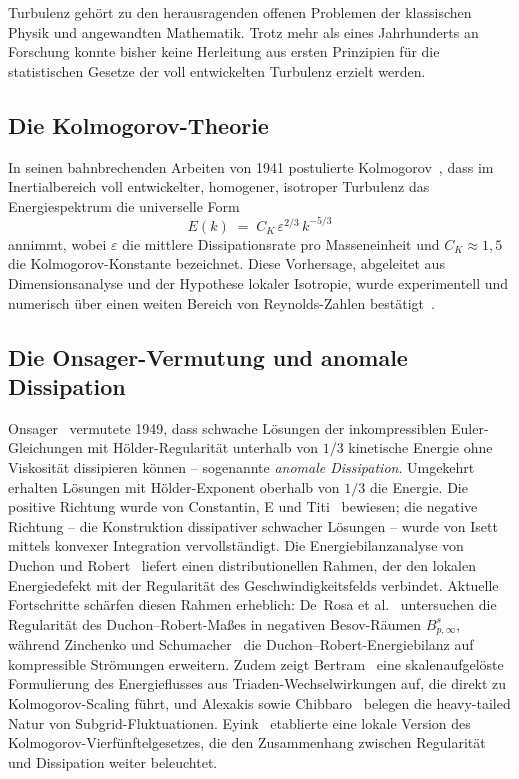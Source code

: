 \documentclass[12pt,a4paper]{article}
\theoremstyle{breakdef}
\theoremstyle{breakplain}
\theoremstyle{breakdef}
\begin{document}
Turbulenz gehört zu den herausragenden offenen Problemen der klassischen
Physik und angewandten Mathematik. Trotz mehr als eines Jahrhunderts an
Forschung konnte bisher keine Herleitung aus ersten Prinzipien für die
statistischen Gesetze der voll entwickelten Turbulenz erzielt werden.

\subsection{Die Kolmogorov-Theorie}

In seinen bahnbrechenden Arbeiten von 1941 postulierte
Kolmogorov~\cite{K41a,K41b}, dass im Inertialbereich voll entwickelter,
homogener, isotroper Turbulenz das Energiespektrum die universelle Form
\begin{equation}\label{eq:K41}
  E(k) \;=\; C_K \,\varepsilon^{2/3}\, k^{-5/3}
\end{equation}
annimmt, wobei $\varepsilon$ die mittlere Dissipationsrate pro
Masseneinheit und $C_K \approx 1{,}5$ die Kolmogorov-Konstante bezeichnet.
Diese Vorhersage, abgeleitet aus Dimensionsanalyse und der Hypothese
lokaler Isotropie, wurde experimentell und numerisch über einen weiten
Bereich von Reynolds-Zahlen bestätigt~\cite{Frisch95,Pope00}.

\subsection{Die Onsager-Vermutung und anomale Dissipation}

Onsager~\cite{Onsager49} vermutete 1949, dass schwache Lösungen der
inkompressiblen Euler-Gleichungen mit Hölder-Regularität unterhalb
von $1/3$ kinetische Energie ohne Viskosität dissipieren können --
sogenannte \emph{anomale Dissipation}. Umgekehrt erhalten Lösungen mit
Hölder-Exponent oberhalb von $1/3$ die Energie. Die \glqq positive\grqq{}
Richtung wurde von Constantin, E und Titi~\cite{CET94} bewiesen; die
\glqq negative\grqq{} Richtung -- die Konstruktion dissipativer schwacher
Lösungen -- wurde von Isett~\cite{Isett18} mittels konvexer Integration
vervollständigt. Die Energiebilanzanalyse von Duchon und
Robert~\cite{DR00} liefert einen distributionellen Rahmen, der den
lokalen Energiedefekt mit der Regularität des Geschwindigkeitsfelds
verbindet.  Aktuelle Fortschritte schärfen diesen Rahmen erheblich: De~Rosa et al.~\cite{DeRosaetAl2026Besov} untersuchen die Regularität des Duchon--Robert-Maßes in negativen Besov-Räumen $B^s_{p,\infty}$, während Zinchenko und Schumacher~\cite{ZinchenkoSchumacher2026} die Duchon--Robert-Energiebilanz auf kompressible Strömungen erweitern. Zudem zeigt Bertram~\cite{Bertram2026} eine skalenaufgelöste Formulierung des Energieflusses aus Triaden-Wechselwirkungen auf, die direkt zu Kolmogorov-Scaling führt, und Alexakis sowie Chibbaro~\cite{AlexakisChibbaro2025} belegen die heavy-tailed Natur von Subgrid-Fluktuationen. Eyink~\cite{Eyink03} etablierte eine lokale Version des
Kolmogorov-Vierfünftelgesetzes, die den Zusammenhang zwischen
Regularität und Dissipation weiter beleuchtet.
\end{document}
